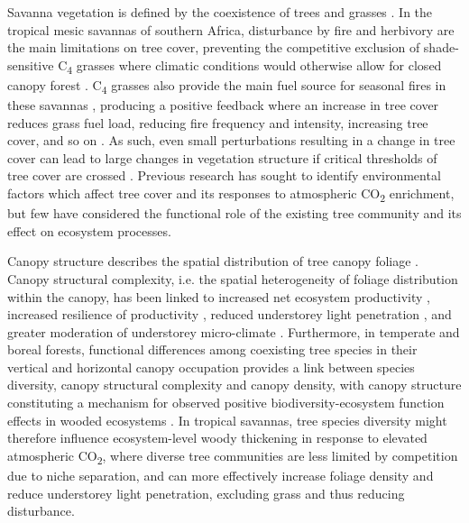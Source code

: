 \documentclass[11pt,a4paper]{article}
\begin{document}
Savanna vegetation is defined by the coexistence of trees and grasses \citep{Scholes1997}. In the tropical mesic savannas of southern Africa, disturbance by fire and herbivory are the main limitations on tree cover, preventing the competitive exclusion of shade-sensitive C\textsubscript{4} grasses where climatic conditions would otherwise allow for closed canopy forest \citep{Sankaran2005}. C\textsubscript{4} grasses also provide the main fuel source for seasonal fires in these savannas \citep{Frost1996}, producing a positive feedback where an increase in tree cover reduces grass fuel load, reducing fire frequency and intensity, increasing tree cover, and so on \citep{Staver2015}. As such, even small perturbations resulting in a change in tree cover can lead to large changes in vegetation structure if critical thresholds of tree cover are crossed \citep{Hirota2011}. Previous research has sought to identify environmental factors which affect tree cover and its responses to atmospheric CO\textsubscript{2} enrichment, but few have considered the functional role of the existing tree community and its effect on ecosystem processes.

Canopy structure describes the spatial distribution of tree canopy foliage \citep{Lowman2004}. Canopy structural complexity, i.e. the spatial heterogeneity of foliage distribution within the canopy, has been linked to increased net ecosystem productivity \citep{Hardiman2011,Chen2012,Law2001,Baldocchi2001,Morin2015}, increased resilience of productivity \citep{Pretzsch2014}, reduced understorey light penetration \citep{Scheuermann2018, Fotis2018}, and greater moderation of understorey micro-climate \citep{Wright2017}. Furthermore, in temperate and boreal forests, functional differences among coexisting tree species in their vertical and horizontal canopy occupation provides a link between species diversity, canopy structural complexity and canopy density, with canopy structure constituting a mechanism for observed positive biodiversity-ecosystem function effects in wooded ecosystems \citep{Pretzsch2014, Barry2019}. In tropical savannas, tree species diversity might therefore influence ecosystem-level woody thickening in response to elevated atmospheric CO\textsubscript{2}, where diverse tree communities are less limited by competition due to niche separation, and can more effectively increase foliage density and reduce understorey light penetration, excluding grass and thus reducing disturbance. 
\end{document}
